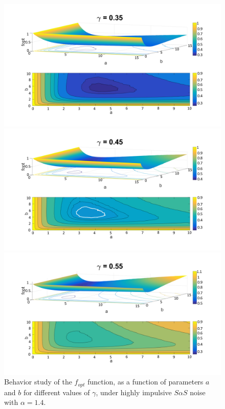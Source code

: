 \documentclass[a4paper]{IEEEtran}
\begin{document}
\begin{figure}
  \begin{multicols}{3}
    \includegraphics[height=0.3\textheight,width=1.05\linewidth]{fig-12a}\par
    \includegraphics[height=0.3\textheight,width=1.05\linewidth]{fig-12b}\par
    \includegraphics[height=0.3\textheight,width=1.05\linewidth]{fig-12c}\par
  \end{multicols}
  \caption{Behavior study of the $f_{opt}$ function, as a function of
    parameters $a$ and $b$ for different values of $\gamma$, under highly
    impulsive $S\alpha S$ noise with $\alpha =1.4$.}
  \label{fig:12}
\end{figure}
\end{document}
